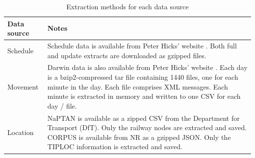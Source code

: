 \documentclass[12pt,a4paper]{article}
\begin{document}
\begin{table}[htb]
\centering
\caption{Extraction methods for each data source}
\label{table:extraction}
\begin{tabular}{|l|p{12cm}|}
\hline
\textbf{Data source} & \textbf{Notes}                                                                                                                                                                                                                                                                                                                                                                                                                                                                                                                                                                                                                                           \\ \hline
Schedule            & Schedule data is available from Peter Hicks’ website . Both full and update extracts are downloaded as gzipped files.                                                                                                                                                                                                                                                                                                                                                                                                                                                                                                                                    \\ \hline
Movement            & Darwin data is also available from Peter Hicks’ website . Each day is a bzip2-compressed tar file containing 1440 files, one for each minute in the day. Each file comprises XML messages. Each minute is extracted in memory and written to one CSV for each day / file.                                                                                                                                                                                                                                                                                                                                                                                \\ \hline
Location            & NaPTAN is available as a zipped CSV from the Department for Transport (DfT). Only the railway nodes are extracted and saved. CORPUS is available from NR as a gzipped JSON. Only the TIPLOC information is extracted and saved.                                                                                                                                                                                                                                                                                                                                                                                                                          \\ \hline

\end{tabular}
\end{table}
\end{document}
